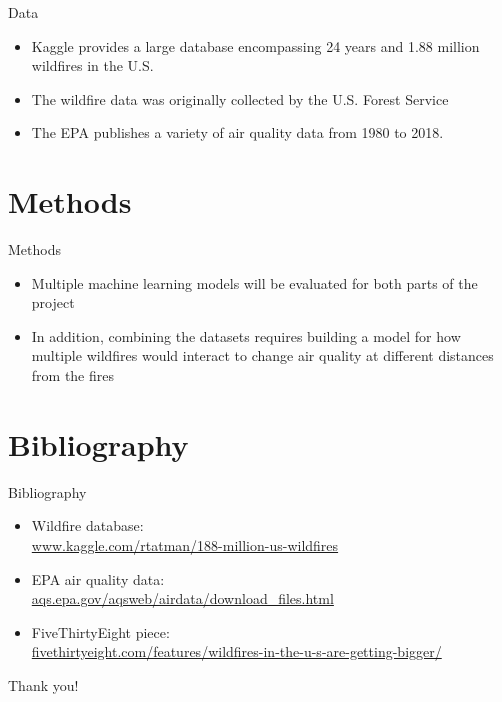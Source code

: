 \documentclass{beamer}
\begin{document}
\begin{frame}{Data}
\begin{itemize}
\item Kaggle provides a large database encompassing 24 years and 1.88 million wildfires in the U.S.
\item The wildfire data was originally collected by the U.S. Forest Service
\item The EPA publishes a variety of air quality data from 1980 to 2018.
\end{itemize}
\end{frame}

\section{Methods}

\begin{frame}{Methods}
\begin{itemize}
\item Multiple machine learning models will be evaluated for both parts of the project
\item In addition, combining the datasets requires building a model for how multiple wildfires would interact to change air quality at different distances from the fires
\end{itemize}
\end{frame}

\section{Bibliography}

\begin{frame}{Bibliography}
\begin{itemize}
\item Wildfire database: \\ \url{www.kaggle.com/rtatman/188-million-us-wildfires}
\item EPA air quality data: \\ \url{aqs.epa.gov/aqsweb/airdata/download_files.html}
\item FiveThirtyEight piece: \\ \url{fivethirtyeight.com/features/wildfires-in-the-u-s-are-getting-bigger/}
\end{itemize}
\end{frame}

\begin{frame}[plain]
\begin{center}
\LARGE Thank you!
\end{center}
\end{frame}
\end{document}
